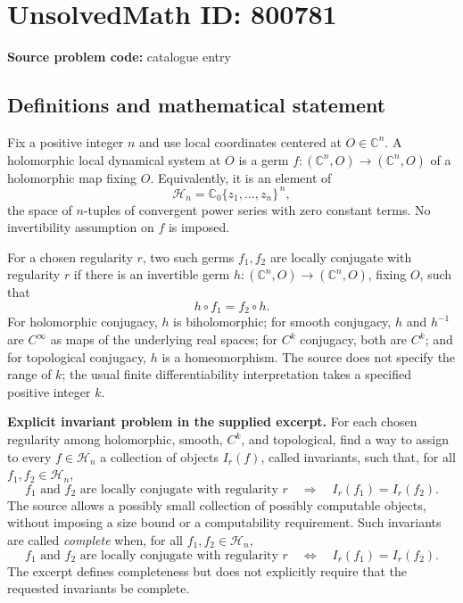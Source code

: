 \documentclass[11pt]{article}
\newcommand{\C}{\mathbb{C}}
\begin{document}
\section*{UnsolvedMath ID: 800781}
\textbf{Source problem code:} catalogue entry
\subsection{Definitions and mathematical statement}
Fix a positive integer \(n\) and use local coordinates centered at \(O\in\C^n\). A holomorphic local dynamical system at \(O\) is a germ \(f:(\C^n,O)\to(\C^n,O)\) of a holomorphic map fixing \(O\). Equivalently, it is an element of
\[
\mathcal H_n=\C_0\{z_1,\ldots,z_n\}^{\,n},
\]
the space of \(n\)-tuples of convergent power series with zero constant terms. No invertibility assumption on \(f\) is imposed.

For a chosen regularity \(r\), two such germs \(f_1,f_2\) are locally conjugate with regularity \(r\) if there is an invertible germ \(h:(\C^n,O)\to(\C^n,O)\), fixing \(O\), such that
\[
h\circ f_1=f_2\circ h.
\]
For holomorphic conjugacy, \(h\) is biholomorphic; for smooth conjugacy, \(h\) and \(h^{-1}\) are \(C^\infty\) as maps of the underlying real spaces; for \(C^k\) conjugacy, both are \(C^k\); and for topological conjugacy, \(h\) is a homeomorphism. The source does not specify the range of \(k\); the usual finite differentiability interpretation takes a specified positive integer \(k\).

\textbf{Explicit invariant problem in the supplied excerpt.} For each chosen regularity among holomorphic, smooth, \(C^k\), and topological, find a way to assign to every \(f\in\mathcal H_n\) a collection of objects \(I_r(f)\), called invariants, such that, for all \(f_1,f_2\in\mathcal H_n\),
\[
f_1\text{ and }f_2\text{ are locally conjugate with regularity }r
\quad\Longrightarrow\quad
I_r(f_1)=I_r(f_2).
\]
The source allows a possibly small collection of possibly computable objects, without imposing a size bound or a computability requirement. Such invariants are called \emph{complete} when, for all \(f_1,f_2\in\mathcal H_n\),
\[
f_1\text{ and }f_2\text{ are locally conjugate with regularity }r
\quad\Longleftrightarrow\quad
I_r(f_1)=I_r(f_2).
\]
The excerpt defines completeness but does not explicitly require that the requested invariants be complete.
\end{document}
